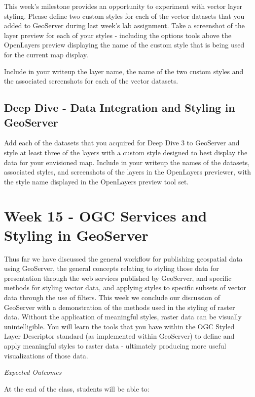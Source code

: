\documentclass[]{book}
\begin{document}
This week's milestone provides an opportunity to experiment with vector
layer styling. Please define two custom styles for each of the vector
datasets that you added to GeoServer during last week's lab assignment.
Take a screenshot of the layer preview for each of your styles -
including the options tools above the OpenLayers preview displaying the
name of the custom style that is being used for the current map display.

Include in your writeup the layer name, the name of the two custom
styles and the associated screenshots for each of the vector datasets.

\section{Deep Dive - Data Integration and Styling in
GeoServer}\label{deep-dive---data-integration-and-styling-in-geoserver}

Add each of the datasets that you acquired for Deep Dive 3 to GeoServer
and style at least three of the layers with a custom style designed to
best display the data for your envisioned map. Include in your writeup
the names of the datasets, associated styles, and screenshots of the
layers in the OpenLayers previewer, with the style name displayed in the
OpenLayers preview tool set.

\chapter{Week 15 - OGC Services and Styling in GeoServer}\label{week15}

Thus far we have discussed the general workflow for publishing
geospatial data using GeoServer, the general concepts relating to
styling those data for presentation through the web services published
by GeoServer, and specific methods for styling vector data, and applying
styles to specific subsets of vector data through the use of filters.
This week we conclude our discussion of GeoServer with a demonstration
of the methods used in the styling of raster data. Without the
application of meaningful styles, raster data can be visually
unintelligible. You will learn the tools that you have within the OGC
Styled Layer Descriptor standard (as implemented within GeoServer) to
define and apply meaningful styles to raster data - ultimately producing
more useful visualizations of those data.

\emph{Expected Outcomes}

At the end of the class, students will be able to:
\end{document}
